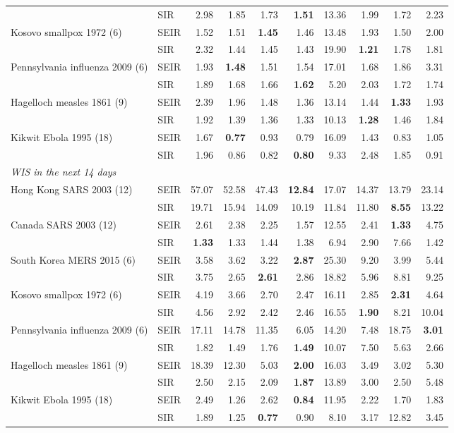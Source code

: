 \begin{tabular}{llrrrrrrrr}
 & SIR & 2.98 & 1.85 & 1.73 & \textbf{1.51} & 13.36 & 1.99 & 1.72 & 2.23 \\
Kosovo smallpox 1972 (6) & SEIR & 1.52 & 1.51 & \textbf{1.45} & 1.46 & 13.48 & 1.93 & 1.50 & 2.00 \\
 & SIR & 2.32 & 1.44 & 1.45 & 1.43 & 19.90 & \textbf{1.21} & 1.78 & 1.81 \\
Pennsylvania influenza 2009 (6) & SEIR & 1.93 & \textbf{1.48} & 1.51 & 1.54 & 17.01 & 1.68 & 1.86 & 3.31 \\
 & SIR & 1.89 & 1.68 & 1.66 & \textbf{1.62} & 5.20 & 2.03 & 1.72 & 1.74 \\
Hagelloch measles 1861 (9) & SEIR & 2.39 & 1.96 & 1.48 & 1.36 & 13.14 & 1.44 & \textbf{1.33} & 1.93 \\
 & SIR & 1.92 & 1.39 & 1.36 & 1.33 & 10.13 & \textbf{1.28} & 1.46 & 1.84 \\
Kikwit Ebola 1995 (18) & SEIR & 1.67 & \textbf{0.77} & 0.93 & 0.79 & 16.09 & 1.43 & 0.83 & 1.05 \\
 & SIR & 1.96 & 0.86 & 0.82 & \textbf{0.80} & 9.33 & 2.48 & 1.85 & 0.91 \\
\midrule
\multicolumn{10}{l}{\textit{WIS in the next 14 days}} \\
Hong Kong SARS 2003 (12) & SEIR & 57.07 & 52.58 & 47.43 & \textbf{12.84} & 17.07 & 14.37 & 13.79 & 23.14 \\
 & SIR & 19.71 & 15.94 & 14.09 & 10.19 & 11.84 & 11.80 & \textbf{8.55} & 13.22 \\
Canada SARS 2003 (12) & SEIR & 2.61 & 2.38 & 2.25 & 1.57 & 12.55 & 2.41 & \textbf{1.33} & 4.75 \\
 & SIR & \textbf{1.33} & 1.33 & 1.44 & 1.38 & 6.94 & 2.90 & 7.66 & 1.42 \\
South Korea MERS 2015 (6) & SEIR & 3.58 & 3.62 & 3.22 & \textbf{2.87} & 25.30 & 9.20 & 3.99 & 5.44 \\
 & SIR & 3.75 & 2.65 & \textbf{2.61} & 2.86 & 18.82 & 5.96 & 8.81 & 9.25 \\
Kosovo smallpox 1972 (6) & SEIR & 4.19 & 3.66 & 2.70 & 2.47 & 16.11 & 2.85 & \textbf{2.31} & 4.64 \\
 & SIR & 4.56 & 2.92 & 2.42 & 2.46 & 16.55 & \textbf{1.90} & 8.21 & 10.04 \\
Pennsylvania influenza 2009 (6) & SEIR & 17.11 & 14.78 & 11.35 & 6.05 & 14.20 & 7.48 & 18.75 & \textbf{3.01} \\
 & SIR & 1.82 & 1.49 & 1.76 & \textbf{1.49} & 10.07 & 7.50 & 5.63 & 2.66 \\
Hagelloch measles 1861 (9) & SEIR & 18.39 & 12.30 & 5.03 & \textbf{2.00} & 16.03 & 3.49 & 3.02 & 5.30 \\
 & SIR & 2.50 & 2.15 & 2.09 & \textbf{1.87} & 13.89 & 3.00 & 2.50 & 5.48 \\
Kikwit Ebola 1995 (18) & SEIR & 2.49 & 1.26 & 2.62 & \textbf{0.84} & 11.95 & 2.22 & 1.70 & 1.83 \\
 & SIR & 1.89 & 1.25 & \textbf{0.77} & 0.90 & 8.10 & 3.17 & 12.82 & 3.45 \\
\bottomrule
\end{tabular}
